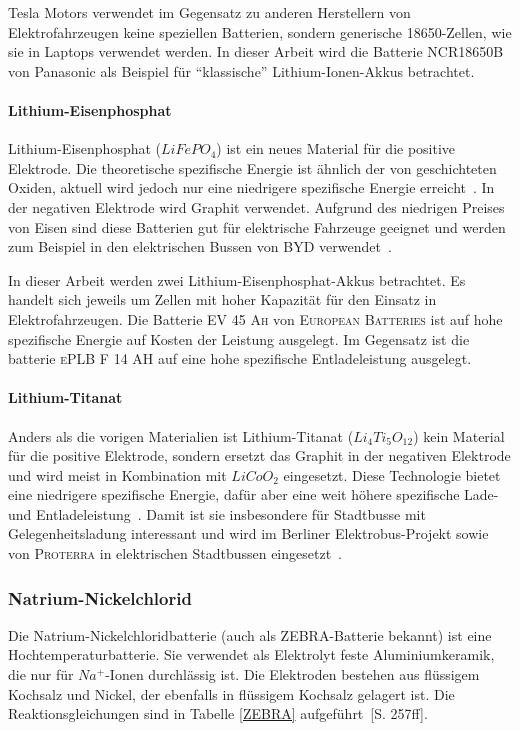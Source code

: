 Tesla Motors verwendet im Gegensatz zu anderen Herstellern von Elektrofahrzeugen keine speziellen Batterien, sondern generische 18650-Zellen, wie sie in Laptops verwendet werden. In dieser Arbeit wird die Batterie NCR18650B von Panasonic als Beispiel für "`klassische"' Lithium-Ionen-Akkus betrachtet.

\paragraph{Lithium-Eisenphosphat}
Lithium-Eisenphosphat ($LiFePO_4$) ist ein neues Material für die positive Elektrode. Die theoretische spezifische Energie ist ähnlich der von geschichteten Oxiden, aktuell wird jedoch nur eine niedrigere spezifische Energie erreicht~\cite{Tie201382}. In der negativen Elektrode wird Graphit verwendet. Aufgrund des niedrigen Preises von Eisen sind diese Batterien gut für elektrische Fahrzeuge geeignet und werden zum Beispiel in den elektrischen Bussen von \textsc{BYD} verwendet~\cite{bydSpecs}.

In dieser Arbeit werden zwei Lithium-Eisenphosphat-Akkus betrachtet. Es handelt sich jeweils um Zellen mit hoher Kapazität für den Einsatz in Elektrofahrzeugen. Die Batterie \textsc{EV 45 Ah} von \textsc{European Batteries} ist auf hohe spezifische Energie auf Kosten der Leistung ausgelegt. Im Gegensatz ist die batterie \textsc{ePLB F 14 AH} auf eine hohe spezifische Entladeleistung ausgelegt.

\paragraph{Lithium-Titanat}
Anders als die vorigen Materialien ist Lithium-Titanat ($Li_4Ti_5O_{12}$) kein Material für die positive Elektrode, sondern ersetzt das Graphit in der negativen Elektrode und wird meist in Kombination mit $LiCoO_2$ eingesetzt. Diese Technologie bietet eine niedrigere spezifische Energie, dafür aber eine weit höhere spezifische Lade- und Entladeleistung~\cite{veneri2012charging}. Damit ist sie insbesondere für Stadtbusse mit Gelegenheitsladung interessant und wird im Berliner Elektrobus-Projekt sowie von \textsc{Proterra} in elektrischen Stadtbussen eingesetzt~\cite{protCat}.

\subsubsection{Natrium-Nickelchlorid}
Die Natrium-Nickelchloridbatterie (auch als ZEBRA-Batterie bekannt) ist eine Hochtemperaturbatterie. Sie verwendet als Elektrolyt feste Aluminiumkeramik, die nur für $Na^+$-Ionen durchlässig ist. Die Elektroden bestehen aus flüssigem Kochsalz und Nickel, der ebenfalls in flüssigem Kochsalz gelagert ist. Die Reaktionsgleichungen sind in Tabelle \ref{ZEBRA} aufgeführt~\cite{KiehneBattery}[S. 257ff].

